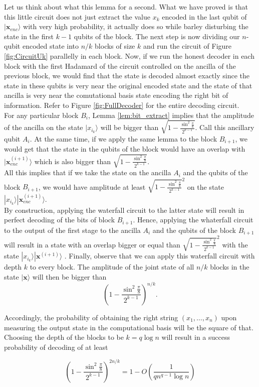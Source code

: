 \documentclass{article}
\theoremstyle{definition}
\newcommand{\ket}[1]{|#1\rangle}
\begin{document}


Let us think about what this lemma for a second. What we have proved is that this little circuit does not just extract the value $x_k$ encoded in the last qubit of $\ket{\textbf{x}_{enc}}$ with very high probability, it actually does so while barley disturbing the state in the first $k-1$ qubits of the block. The next step is now dividing our $n$-qubit encoded state into $n/k$ blocks of size $k$ and run the circuit of Figure \ref{fig:CircuitUk} parallelly in each block. Now, if we run the honest decoder in each block with the first Hadamard of the circuit controlled on the ancilla of the previous block, we would find that the state is decoded almost exactly since the state in these qubits is very near the original encoded state and the state of that ancilla is very near the comutational basis state encoding the right bit of information. Refer to Figure \ref{fig:FullDecoder} for the entire decoding circuit.\\

For any particular block $B_i$, Lemma \ref{lem:bit_extract} implies that the amplitude of the ancilla on the state $\ket{x_{i_k}}$ will be  bigger than $ \sqrt{1-\frac{\sin^2\frac{\pi}{8}}{2^{k-1}}}$. Call this ancillary qubit $A_i$. At the same time, if we apply the same lemma to the block $B_{i+1}$, we would get that the state in the qubits of the block would have an overlap with $\ket{\textbf{x}^{(i+1)}_{enc}}$ which is also bigger than $ \sqrt{1-\frac{\sin^2\frac{\pi}{8}}{2^{k-1}}}$.\\

All this implies that if we take the state on the ancilla $A_i$ and the qubits of the block $B_{i+1}$, we would have amplitude at least $ \sqrt{1-\frac{\sin^2\frac{\pi}{8}}{2^{k-1}}}^2$ on the state $\ket{x_{i_k}}\ket{\textbf{x}^{(i+1)}_{enc}}$.\\

By construction, applying the waterfall circuit to the latter state will result in perfect decoding of the bits of block $B_{i+1}$. Hence, applying the whaterfall circuit to the output of the first stage to the ancilla $A_i$ and the qubits of the block $B_{i+1}$ will result in a state with an overlap bigger or equal than $\sqrt{1-\frac{\sin^2\frac{\pi}{8}}{2^{k-1}}}^2$ with the state $\ket{x_{i_k}}\ket{\textbf{x}^{(i+1)}}$ . Finally, observe that we can apply this waterfall circuit with depth $k$ to every block. The amplitude of the  joint state of all $n/k$ blocks in the state $\ket{\textbf{x}}$ will then be bigger than
\begin{equation}
 \left(1-\frac{\sin^2\frac{\pi}{8}}{2^{k-1}}\right)^{n/k}.
\end{equation}

Accordingly, the probability of obtaining the right string $(x_1,\dots,x_n)$ upon measuring the output state in the computational basis will be the square of that. Choosing the depth of the blocks to be $k=q\log n$ will result in a success probability of decoding of at least

\begin{equation}
 \left(1-\frac{\sin^2\frac{\pi}{8}}{2^{k-1}}\right)^{2n/k}=1-O\left(\frac{1}{qn^{q-1}\log n}\right)
\end{equation}
\end{document}
